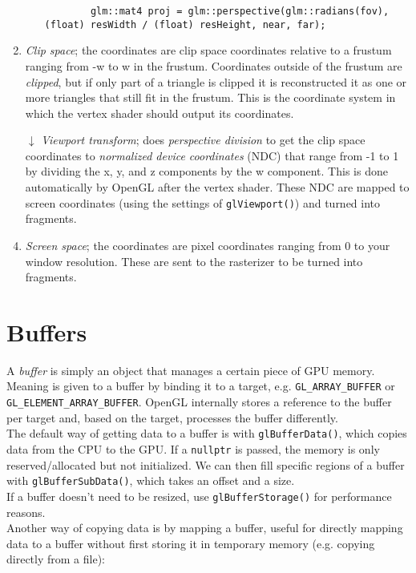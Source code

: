 \documentclass[8pt, table, xcdraw]{article}%
\begin{document}
\begin{enumerate}
\begin{itemize}
        \begin{lstlisting}
        glm::mat4 proj = glm::perspective(glm::radians(fov), (float) resWidth / (float) resHeight, near, far);
        \end{lstlisting}
    \end{itemize}
    \item \emph{Clip space}; the coordinates are clip space coordinates relative to a frustum ranging from -w to w in the frustum. Coordinates outside of the frustum are \emph{clipped}, but if only part of a triangle is clipped it is reconstructed it as one or more triangles that still fit in the frustum. This is the coordinate system in which the vertex shader should output its coordinates.
    \item[\large$\downarrow$] \emph{Viewport transform}; does \emph{perspective division} to get the clip space coordinates to \emph{normalized device coordinates} (NDC) that range from -1 to 1 by dividing the x, y, and z components by the w component. This is done automatically by OpenGL after the vertex shader. These NDC are mapped to screen coordinates (using the settings of \lstinline{glViewport()}) and turned into fragments.
    \item \emph{Screen space}; the coordinates are pixel coordinates ranging from 0 to your window resolution. These are sent to the rasterizer to be turned into fragments.
\end{enumerate}

\section{Buffers}

A \emph{buffer} is simply an object that manages a certain piece of GPU memory. Meaning is given to a buffer by binding it to a target, e.g. \lstinline{GL_ARRAY_BUFFER} or \lstinline{GL_ELEMENT_ARRAY_BUFFER}. OpenGL internally stores a reference to the buffer per target and, based on the target, processes the buffer differently.\\
The default way of getting data to a buffer is with \lstinline{glBufferData()}, which copies data from the CPU to the GPU. If a \lstinline{nullptr} is passed, the memory is only reserved/allocated but not initialized. We can then fill specific regions of a buffer with \lstinline{glBufferSubData()}, which takes an offset and a size.\\
If a buffer doesn't need to be resized, use \lstinline{glBufferStorage()} for performance reasons.\\
Another way of copying data is by mapping a buffer, useful for directly mapping data to a buffer without first storing it in temporary memory (e.g. copying directly from a file):
\end{document}
